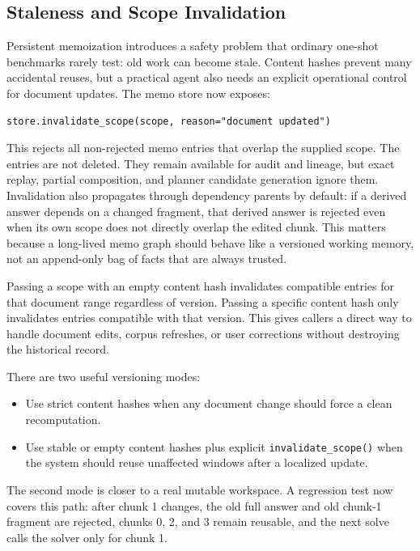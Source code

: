 \documentclass[11pt]{article}
\begin{document}
\subsection{Staleness and Scope Invalidation}

Persistent memoization introduces a safety problem that ordinary one-shot
benchmarks rarely test: old work can become stale. Content hashes prevent many
accidental reuses, but a practical agent also needs an explicit operational
control for document updates. The memo store now exposes:

\begin{verbatim}
store.invalidate_scope(scope, reason="document updated")
\end{verbatim}

This rejects all non-rejected memo entries that overlap the supplied scope. The
entries are not deleted. They remain available for audit and lineage, but exact
replay, partial composition, and planner candidate generation ignore them.
Invalidation also propagates through dependency parents by default: if a
derived answer depends on a changed fragment, that derived answer is rejected
even when its own scope does not directly overlap the edited chunk. This matters
because a long-lived memo graph should behave like a versioned working memory,
not an append-only bag of facts that are always trusted.

Passing a scope with an empty content hash invalidates compatible entries for
that document range regardless of version. Passing a specific content hash only
invalidates entries compatible with that version. This gives callers a direct
way to handle document edits, corpus refreshes, or user corrections without
destroying the historical record.

There are two useful versioning modes:

\begin{itemize}[leftmargin=*]
    \item Use strict content hashes when any document change should force a
    clean recomputation.
    \item Use stable or empty content hashes plus explicit
    \texttt{invalidate\_scope()} when the system should reuse unaffected
    windows after a localized update.
\end{itemize}

The second mode is closer to a real mutable workspace. A regression test now
covers this path: after chunk 1 changes, the old full answer and old chunk-1
fragment are rejected, chunks 0, 2, and 3 remain reusable, and the next solve
calls the solver only for chunk 1.
\end{document}
